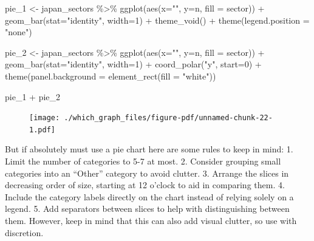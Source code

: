 \documentclass[
  letterpaper,
]{book}
\newenvironment{Shaded}{\begin{snugshade}}{\end{snugshade}}
\newcommand{\AttributeTok}[1]{\textcolor[rgb]{0.40,0.45,0.13}{#1}}
\newcommand{\DecValTok}[1]{\textcolor[rgb]{0.68,0.00,0.00}{#1}}
\newcommand{\FunctionTok}[1]{\textcolor[rgb]{0.28,0.35,0.67}{#1}}
\newcommand{\NormalTok}[1]{\textcolor[rgb]{0.00,0.23,0.31}{#1}}
\newcommand{\OtherTok}[1]{\textcolor[rgb]{0.00,0.23,0.31}{#1}}
\newcommand{\SpecialCharTok}[1]{\textcolor[rgb]{0.37,0.37,0.37}{#1}}
\newcommand{\StringTok}[1]{\textcolor[rgb]{0.13,0.47,0.30}{#1}}
\begin{document}
\begin{Shaded}
\begin{Highlighting}[]
\NormalTok{pie\_1 }\OtherTok{\textless{}{-}}\NormalTok{ japan\_sectors }\SpecialCharTok{\%\textgreater{}\%}
  \FunctionTok{ggplot}\NormalTok{(}\FunctionTok{aes}\NormalTok{(}\AttributeTok{x=}\StringTok{""}\NormalTok{, }\AttributeTok{y=}\NormalTok{n, }\AttributeTok{fill =}\NormalTok{ sector)) }\SpecialCharTok{+}
  \FunctionTok{geom\_bar}\NormalTok{(}\AttributeTok{stat=}\StringTok{"identity"}\NormalTok{, }\AttributeTok{width=}\DecValTok{1}\NormalTok{) }\SpecialCharTok{+}
    \FunctionTok{theme\_void}\NormalTok{()  }\SpecialCharTok{+}
  \FunctionTok{theme}\NormalTok{(}\AttributeTok{legend.position =} \StringTok{"none"}\NormalTok{)}

\NormalTok{pie\_2 }\OtherTok{\textless{}{-}}\NormalTok{ japan\_sectors }\SpecialCharTok{\%\textgreater{}\%}
  \FunctionTok{ggplot}\NormalTok{(}\FunctionTok{aes}\NormalTok{(}\AttributeTok{x=}\StringTok{""}\NormalTok{, }\AttributeTok{y=}\NormalTok{n, }\AttributeTok{fill =}\NormalTok{ sector)) }\SpecialCharTok{+}
  \FunctionTok{geom\_bar}\NormalTok{(}\AttributeTok{stat=}\StringTok{"identity"}\NormalTok{, }\AttributeTok{width=}\DecValTok{1}\NormalTok{) }\SpecialCharTok{+}
  \FunctionTok{coord\_polar}\NormalTok{(}\StringTok{"y"}\NormalTok{, }\AttributeTok{start=}\DecValTok{0}\NormalTok{) }\SpecialCharTok{+}
  \FunctionTok{theme}\NormalTok{(}\AttributeTok{panel.background =} \FunctionTok{element\_rect}\NormalTok{(}\AttributeTok{fill =} \StringTok{"white"}\NormalTok{))}

\NormalTok{pie\_1 }\SpecialCharTok{+}\NormalTok{ pie\_2 }
\end{Highlighting}
\end{Shaded}

\begin{figure}[H]

{\centering \texttt{[image: ./which\_graph\_files/figure-pdf/unnamed-chunk-22-1.pdf]}

}

\end{figure}

But if absolutely must use a pie chart here are some rules to keep in
mind: 1. Limit the number of categories to 5-7 at most. 2. Consider
grouping small categories into an ``Other'' category to avoid clutter.
3. Arrange the slices in decreasing order of size, starting at 12
o'clock to aid in comparing them. 4. Include the category labels
directly on the chart instead of relying solely on a legend. 5. Add
separators between slices to help with distinguishing between them.
However, keep in mind that this can also add visual clutter, so use with
discretion.
\end{document}
